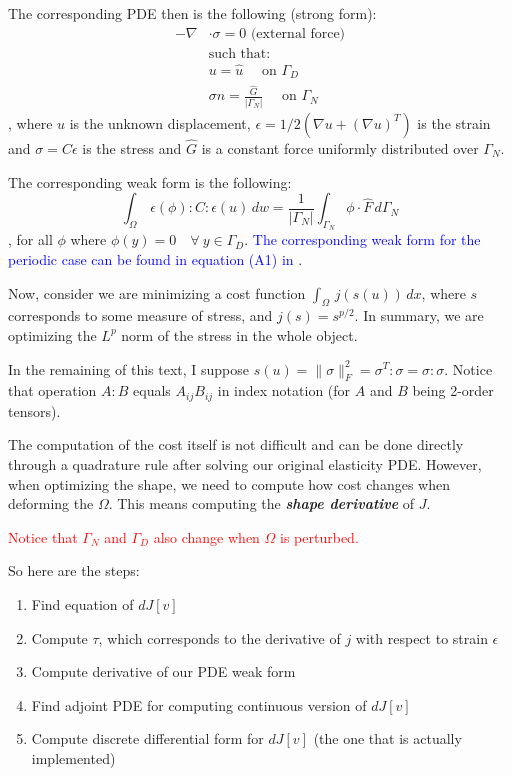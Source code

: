 \documentclass[11pt]{article}
\newcommand{\red}{\textcolor{red}}
\newcommand{\blue}{\textcolor{blue}}
\begin{document}
The corresponding PDE then is the following (strong form):
\begin{align*}
  - \nabla & \cdot \sigma = 0 \text{ (external force)} \\
  &\text{such that: } \\
  &u =  \hat u \quad \text{ on $\Gamma_D$}\\
  &\sigma n = \frac{\hat G}{|\Gamma_N|}  \quad \text{ on $\Gamma_N$}
\end{align*}
, where $u$ is the unknown displacement, $\epsilon = 1/2 (\nabla u + (\nabla u)^T)$ is the strain and $\sigma = C \epsilon$ is the stress and $\hat G$ is a constant force uniformly distributed over $\Gamma_N$.

The corresponding weak form is the following:
\begin{equation}
\int_\Omega\, \epsilon(\phi) : C : \epsilon(u)\, dw = \frac{1}{|\Gamma_N|}\int_{\Gamma_N} \phi \cdot \hat F\, d\Gamma_N
  \label{eq:weakform}
\end{equation}
, for all $\phi$ where $\phi(y) = 0 \quad \forall \:  y \in \Gamma_D$. \blue{The corresponding weak form for the periodic case can be found in equation (A1) in \cite{panetta2017}}.

Now, consider we are minimizing a cost function $\int_\Omega\, j(s(u))\, dx$, where $s$ corresponds to some measure of stress, and $j(s) = s^{p/2}$. In summary, we are optimizing the $L^p$ norm of the stress in the whole object.

In the remaining of this text, I suppose $s(u) = \| \sigma \|^2_F = \sigma^T : \sigma = \sigma : \sigma$. Notice that operation $A:B$ equals $A_{ij} B_{ij}$ in index notation (for $A$ and $B$ being 2-order tensors).

The computation of the cost itself is not difficult and can be done directly through a quadrature rule after solving our original elasticity PDE. However, when optimizing the shape, we need to compute how cost changes when deforming the $\Omega$. This means computing the \textbf{\emph{shape derivative}} of $J$.

\red{Notice that $\Gamma_{N}$ and $\Gamma_{D}$ also change when $\Omega$ is perturbed.}

So here are the steps:
\begin{enumerate}
  \item Find equation of $dJ[v]$
  \item Compute $\tau$, which corresponds to the derivative of $j$ with respect to strain $\epsilon$
  \item Compute derivative of our PDE weak form
  \item Find adjoint PDE for computing continuous version of $dJ[v]$
  \item Compute discrete differential form for $dJ[v]$ (the one that is actually implemented)
\end{enumerate}
\end{document}
